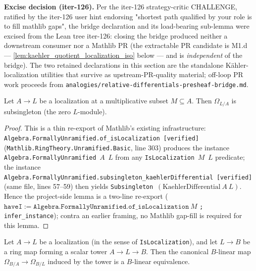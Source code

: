 \textbf{Excise decision (iter-126).} Per the iter-126 strategy-critic CHALLENGE, ratified by the iter-126 user hint endorsing "shortest path qualified by your role is to fill mathlib gaps", the bridge declaration and its load-bearing sub-lemma were excised from the Lean tree iter-126: closing the bridge produced neither a downstream consumer nor a Mathlib PR (the extractable PR candidate is M1.d — \cref{lem:kaehler_quotient_localization_iso} below — and is \emph{independent} of the bridge). The two retained declarations in this section are the standalone K\"ahler-localization utilities that survive as upstream-PR-quality material; off-loop PR work proceeds from \texttt{analogies/relative-differentials-presheaf-bridge.md}.

\begin{lemma}
  \label{lem:kaehler_localization_subsingleton}
  Let \(A \to L\) be a localization at a multiplicative subset \(M \subseteq A\). Then \(\Omega_{L / A}\) is subsingleton (the zero \(L\)-module).
\end{lemma}

\begin{proof}

\leanok
  This is a thin re-export of Mathlib's existing infrastructure: \texttt{Algebra.FormallyUnramified.of\_isLocalization}~\texttt{[verified]} (\texttt{Mathlib.RingTheory.Unramified.Basic}, line 303) produces the instance \texttt{Algebra.FormallyUnramified}~\(A\)~\(L\) from any \texttt{IsLocalization}~\(M\)~\(L\) predicate; the instance \texttt{Algebra.FormallyUnramified.subsingleton\_kaehlerDifferential}~\texttt{[verified]} (same file, lines 57--59) then yields \texttt{Subsingleton}~\((\mathrm{KaehlerDifferential}~A~L)\). Hence the project-side lemma is a two-line re-export (\(\mathtt{haveI} := \mathtt{Algebra.FormallyUnramified.of\_isLocalization}~M\) \texttt{; infer\_instance}); contra an earlier framing, no Mathlib gap-fill is required for this lemma.
\end{proof}

\begin{lemma}
  \label{lem:kaehler_quotient_localization_iso}
  
  Let \(A \to L\) be a localization (in the sense of \texttt{IsLocalization}), and let \(L \to B\) be a ring map forming a scalar tower \(A \to L \to B\). Then the canonical \(B\)-linear map \(\Omega_{B/A} \to \Omega_{B/L}\) induced by the tower is a \(B\)-linear equivalence.
\end{lemma}

